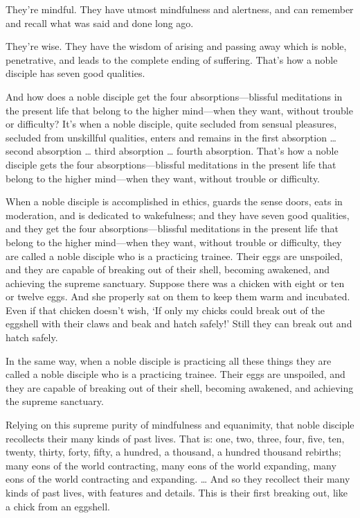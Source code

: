 \documentclass[12pt,openany]{book}%
\begin{document}
They’re mindful. They have utmost mindfulness and alertness, and can remember and recall what was said and done long ago. 

They’re wise. They have the wisdom of arising and passing away which is noble, penetrative, and leads to the complete ending of suffering. That’s how a noble disciple has seven good qualities. 

And how does a noble disciple get the four absorptions—blissful meditations in the present life that belong to the higher mind—when they want, without trouble or difficulty? It’s when a noble disciple, quite secluded from sensual pleasures, secluded from unskillful qualities, enters and remains in the first absorption … second absorption … third absorption … fourth absorption. That’s how a noble disciple gets the four absorptions—blissful meditations in the present life that belong to the higher mind—when they want, without trouble or difficulty. 

When a noble disciple is accomplished in ethics, guards the sense doors, eats in moderation, and is dedicated to wakefulness; and they have seven good qualities, and they get the four absorptions—blissful meditations in the present life that belong to the higher mind—when they want, without trouble or difficulty, they are called a noble disciple who is a practicing trainee. Their eggs are unspoiled, and they are capable of breaking out of their shell, becoming awakened, and achieving the supreme sanctuary. Suppose there was a chicken with eight or ten or twelve eggs. And she properly sat on them to keep them warm and incubated. Even if that chicken doesn’t wish, ‘If only my chicks could break out of the eggshell with their claws and beak and hatch safely!’ Still they can break out and hatch safely. 

In the same way, when a noble disciple is practicing all these things they are called a noble disciple who is a practicing trainee. Their eggs are unspoiled, and they are capable of breaking out of their shell, becoming awakened, and achieving the supreme sanctuary. 

Relying on this supreme purity of mindfulness and equanimity, that noble disciple recollects their many kinds of past lives. That is: one, two, three, four, five, ten, twenty, thirty, forty, fifty, a hundred, a thousand, a hundred thousand rebirths; many eons of the world contracting, many eons of the world expanding, many eons of the world contracting and expanding. … And so they recollect their many kinds of past lives, with features and details. This is their first breaking out, like a chick from an eggshell. 
\end{document}
